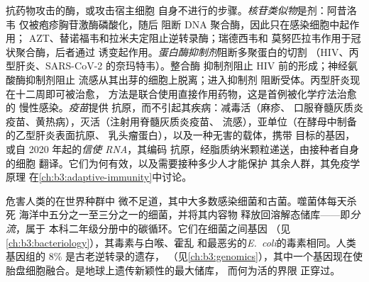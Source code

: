 \begin{definition}[抗病毒药物与疫苗]\label{def:b3:virology:drugs}
抗药物攻击的酶，或攻击宿主细胞
自身不进行的步骤。\emph{核苷类似物}是剂：阿昔洛韦
仅被疱疹胸苷激酶磷酸化，随后
阻断 DNA 聚合酶，因此只在感染细胞中起作用；
AZT、替诺福韦和拉米夫定阻止逆转录酶；瑞德西韦和
莫努匹拉韦作用于冠状聚合酶，后者通过
诱变起作用。\emph{蛋白酶抑制剂}阻断多聚蛋白的切割
（HIV、丙型肝炎、SARS-CoV-2 的奈玛特韦）。整合酶
抑制剂阻止 HIV 前的形成；神经氨酸酶抑制剂阻止
流感从其出芽的细胞上脱离；进入抑制剂
阻断受体。丙型肝炎现在十二周即可被治愈，
方法是联合使用直接作用药物，这是首例被化学疗法治愈的
慢性感染。\emph{疫苗}提供
抗原，而不引起其疾病：减毒活（麻疹、
口服脊髓灰质炎疫苗、黄热病），灭活（注射用脊髓灰质炎疫苗、
流感），亚单位（在酵母中制备的乙型肝炎表面抗原、
乳头瘤蛋白），以及一种无害的载体，携带
目标的基因，或自 2020 年起的\emph{信使 RNA}，其编码
抗原，经脂质纳米颗粒递送，由接种者自身的细胞
翻译。它们为何有效，以及需要接种多少人才能保护
其余人群，其免疫学原理
在\cref{ch:b3:adaptive-immunity}中讨论。
\end{definition}

\begin{remark}[生命经济中的病毒]\label{rem:b3:virology:economy}
危害人类的在世界种群中
微不足道，其中大多数感染细菌和古菌。噬菌体每天杀死
海洋中五分之一至三分之一的细菌，并将其内容物
释放回溶解态储库——即\emph{分流}，属于
本科二年级分册中的碳循环。它们在细菌之间基因
（见\cref{ch:b3:bacteriology}），其毒素与白喉、霍乱
和最恶劣的\emph{E.~coli}的毒素相同。人类基因组的 8\%
是古老逆转录的遗存，
（见\cref{ch:b3:genomics}），其中一个基因现在使
胎盘细胞融合。是地球上遗传新颖性的最大储库，
而何为活的界限
正穿过。
\end{remark}

